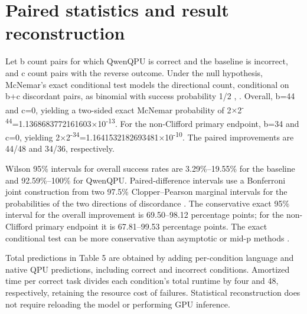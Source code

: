 \documentclass[11pt,a4paper]{article}
\begin{document}
\section{Paired statistics and result reconstruction}

Let b count pairs for which QwenQPU is correct and the baseline is incorrect, and c count pairs with the reverse outcome. Under the null hypothesis, McNemar's exact conditional test models the directional count, conditional on b+c discordant pairs, as binomial with success probability 1/2 \cite{ref28}, \cite{ref29}. Overall, b=44 and c=0, yielding a two-sided exact McNemar probability of 2\ensuremath{\times}2\textsuperscript{-44}=1.1368683772161603\ensuremath{\times}10\textsuperscript{-13}. For the non-Clifford primary endpoint, b=34 and c=0, yielding 2\ensuremath{\times}2\textsuperscript{-34}=1.1641532182693481\ensuremath{\times}10\textsuperscript{-10}. The paired improvements are 44/48 and 34/36, respectively.

Wilson 95\% intervals for overall success rates are 3.29\%--19.55\% for the baseline and 92.59\%--100\% for QwenQPU. Paired-difference intervals use a Bonferroni joint construction from two 97.5\% Clopper--Pearson marginal intervals for the probabilities of the two directions of discordance \cite{ref30}. The conservative exact 95\% interval for the overall improvement is 69.50--98.12 percentage points; for the non-Clifford primary endpoint it is 67.81--99.53 percentage points. The exact conditional test can be more conservative than asymptotic or mid-p methods \cite{ref29}.

Total predictions in Table 5 are obtained by adding per-condition language and native QPU predictions, including correct and incorrect conditions. Amortized time per correct task divides each condition's total runtime by four and 48, respectively, retaining the resource cost of failures. Statistical reconstruction does not require reloading the model or performing GPU inference.
\end{document}
